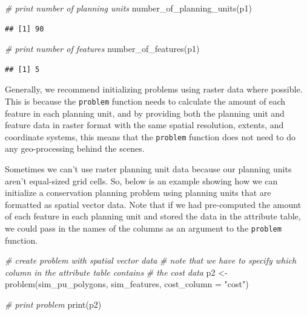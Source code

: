\documentclass[
  12pt,
]{book}
\newenvironment{Shaded}{\begin{snugshade}}{\end{snugshade}}
\newcommand{\AttributeTok}[1]{\textcolor[rgb]{0.77,0.63,0.00}{#1}}
\newcommand{\CommentTok}[1]{\textcolor[rgb]{0.56,0.35,0.01}{\textit{#1}}}
\newcommand{\FunctionTok}[1]{\textcolor[rgb]{0.00,0.00,0.00}{#1}}
\newcommand{\NormalTok}[1]{#1}
\newcommand{\OtherTok}[1]{\textcolor[rgb]{0.56,0.35,0.01}{#1}}
\newcommand{\StringTok}[1]{\textcolor[rgb]{0.31,0.60,0.02}{#1}}
\begin{document}
\begin{Shaded}
\begin{Highlighting}[]
\CommentTok{\# print number of planning units}
\FunctionTok{number\_of\_planning\_units}\NormalTok{(p1)}
\end{Highlighting}
\end{Shaded}

\begin{verbatim}
## [1] 90
\end{verbatim}

\begin{Shaded}
\begin{Highlighting}[]
\CommentTok{\# print number of features}
\FunctionTok{number\_of\_features}\NormalTok{(p1)}
\end{Highlighting}
\end{Shaded}

\begin{verbatim}
## [1] 5
\end{verbatim}

Generally, we recommend initializing problems using raster data where possible. This is because the \texttt{problem} function needs to calculate the amount of each feature in each planning unit, and by providing both the planning unit and feature data in raster format with the same spatial resolution, extents, and coordinate systems, this means that the \texttt{problem} function does not need to do any geo-processing behind the scenes.

Sometimes we can't use raster planning unit data because our planning units aren't equal-sized grid cells. So, below is an example showing how we can initialize a conservation planning problem using planning units that are formatted as spatial vector data. Note that if we had pre-computed the amount of each feature in each planning unit and stored the data in the attribute table, we could pass in the names of the columns as an argument to the \texttt{problem} function.

\begin{Shaded}
\begin{Highlighting}[]
\CommentTok{\# create problem with spatial vector data}
\CommentTok{\# note that we have to specify which column in the attribute table contains}
\CommentTok{\# the cost data}
\NormalTok{p2 }\OtherTok{\textless{}{-}} \FunctionTok{problem}\NormalTok{(sim\_pu\_polygons, sim\_features, }\AttributeTok{cost\_column =} \StringTok{"cost"}\NormalTok{)}

\CommentTok{\# print problem}
\FunctionTok{print}\NormalTok{(p2)}
\end{Highlighting}
\end{Shaded}
\end{document}
